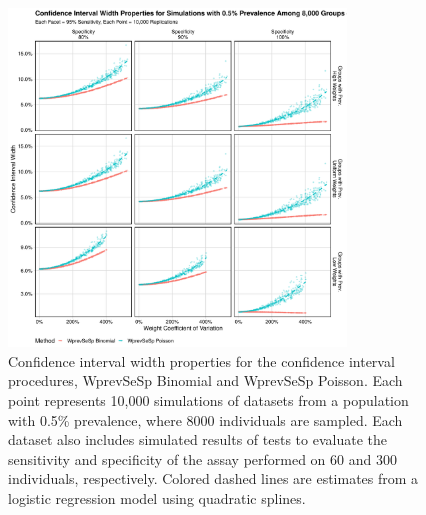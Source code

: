 \begin{figure}
\centering
\includegraphics[width=0.8\textwidth]{imperfect_confidence_interval_width_8000_groups_0_005_prev}
\caption{Confidence interval width properties for the confidence interval procedures, WprevSeSp Binomial and WprevSeSp Poisson.
Each point represents 10,000 simulations of datasets from a population with 0.5\% prevalence, where 8000 individuals are sampled.
Each dataset also includes simulated results of tests to evaluate the sensitivity and specificity of the assay performed on 60 and 300 individuals, respectively.
Colored dashed lines are estimates from a logistic regression model using quadratic splines.}
\label{ch_3:fig:imperfect_confidence_interval_width_8000_groups_0_005_prev}
\end{figure}


